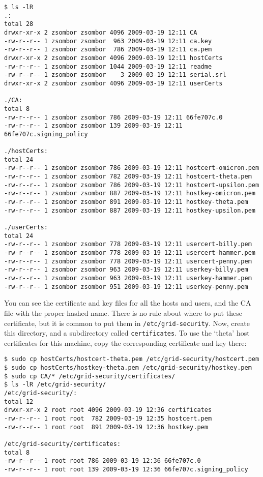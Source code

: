 \documentclass{article}
\begin{document}
\begin{verbatim}
$ ls -lR
.:
total 28
drwxr-xr-x 2 zsombor zsombor 4096 2009-03-19 12:11 CA
-rw-r--r-- 1 zsombor zsombor  963 2009-03-19 12:11 ca.key
-rw-r--r-- 1 zsombor zsombor  786 2009-03-19 12:11 ca.pem
drwxr-xr-x 2 zsombor zsombor 4096 2009-03-19 12:11 hostCerts
-rw-r--r-- 1 zsombor zsombor 1044 2009-03-19 12:11 readme
-rw-r--r-- 1 zsombor zsombor    3 2009-03-19 12:11 serial.srl
drwxr-xr-x 2 zsombor zsombor 4096 2009-03-19 12:11 userCerts

./CA:
total 8
-rw-r--r-- 1 zsombor zsombor 786 2009-03-19 12:11 66fe707c.0
-rw-r--r-- 1 zsombor zsombor 139 2009-03-19 12:11 66fe707c.signing_policy

./hostCerts:
total 24
-rw-r--r-- 1 zsombor zsombor 786 2009-03-19 12:11 hostcert-omicron.pem
-rw-r--r-- 1 zsombor zsombor 782 2009-03-19 12:11 hostcert-theta.pem
-rw-r--r-- 1 zsombor zsombor 786 2009-03-19 12:11 hostcert-upsilon.pem
-rw-r--r-- 1 zsombor zsombor 887 2009-03-19 12:11 hostkey-omicron.pem
-rw-r--r-- 1 zsombor zsombor 891 2009-03-19 12:11 hostkey-theta.pem
-rw-r--r-- 1 zsombor zsombor 887 2009-03-19 12:11 hostkey-upsilon.pem

./userCerts:
total 24
-rw-r--r-- 1 zsombor zsombor 778 2009-03-19 12:11 usercert-billy.pem
-rw-r--r-- 1 zsombor zsombor 778 2009-03-19 12:11 usercert-hammer.pem
-rw-r--r-- 1 zsombor zsombor 778 2009-03-19 12:11 usercert-penny.pem
-rw-r--r-- 1 zsombor zsombor 963 2009-03-19 12:11 userkey-billy.pem
-rw-r--r-- 1 zsombor zsombor 963 2009-03-19 12:11 userkey-hammer.pem
-rw-r--r-- 1 zsombor zsombor 951 2009-03-19 12:11 userkey-penny.pem
\end{verbatim}

You can see the certificate and key files for all the hosts and users, and the CA file with the proper hashed name.
There is no rule about where to put these certificate, but it is common to put them in \verb!/etc/grid-security!. Now, create this directory, and a subdirectory called \verb!certificates!. To use the `theta' host certificates for this machine, copy the corresponding certificate and key there:

\begin{verbatim}
$ sudo cp hostCerts/hostcert-theta.pem /etc/grid-security/hostcert.pem
$ sudo cp hostCerts/hostkey-theta.pem /etc/grid-security/hostkey.pem
$ sudo cp CA/* /etc/grid-security/certificates/
$ ls -lR /etc/grid-security/
/etc/grid-security/:
total 12
drwxr-xr-x 2 root root 4096 2009-03-19 12:36 certificates
-rw-r--r-- 1 root root  782 2009-03-19 12:35 hostcert.pem
-rw-r--r-- 1 root root  891 2009-03-19 12:36 hostkey.pem

/etc/grid-security/certificates:
total 8
-rw-r--r-- 1 root root 786 2009-03-19 12:36 66fe707c.0
-rw-r--r-- 1 root root 139 2009-03-19 12:36 66fe707c.signing_policy
\end{verbatim}
\end{document}
